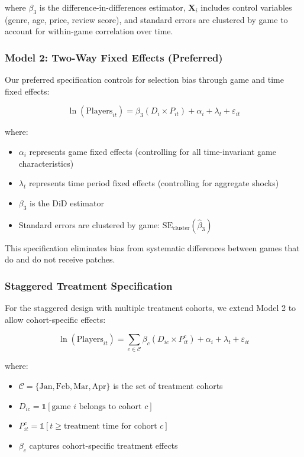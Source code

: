 \documentclass[12pt,a4paper]{article}
\begin{document}
where $\beta_3$ is the difference-in-differences estimator, $\mathbf{X}_i$ includes control variables (genre, age, price, review score), and standard errors are clustered by game to account for within-game correlation over time.

\subsubsection{Model 2: Two-Way Fixed Effects (Preferred)}

Our preferred specification controls for selection bias through game and time fixed effects:

\begin{equation}
\ln(\text{Players}_{it}) = \beta_3 (D_i \times P_{it}) + \alpha_i + \lambda_t + \varepsilon_{it}
\label{eq:twfe}
\end{equation}

where:
\begin{itemize}
    \item $\alpha_i$ represents game fixed effects (controlling for all time-invariant game characteristics)
    \item $\lambda_t$ represents time period fixed effects (controlling for aggregate shocks)
    \item $\beta_3$ is the DiD estimator
    \item Standard errors are clustered by game: $\text{SE}_{\text{cluster}}(\hat{\beta}_3)$
\end{itemize}

This specification eliminates bias from systematic differences between games that do and do not receive patches.

\subsubsection{Staggered Treatment Specification}

For the staggered design with multiple treatment cohorts, we extend Model 2 to allow cohort-specific effects:

\begin{equation}
\ln(\text{Players}_{it}) = \sum_{c \in \mathcal{C}} \beta_c (D_{ic} \times P_{it}^c) + \alpha_i + \lambda_t + \varepsilon_{it}
\label{eq:staggered}
\end{equation}

where:
\begin{itemize}
    \item $\mathcal{C} = \{\text{Jan}, \text{Feb}, \text{Mar}, \text{Apr}\}$ is the set of treatment cohorts
    \item $D_{ic} = \mathbb{1}[\text{game } i \text{ belongs to cohort } c]$
    \item $P_{it}^c = \mathbb{1}[t \geq \text{treatment time for cohort } c]$
    \item $\beta_c$ captures cohort-specific treatment effects
\end{itemize}
\end{document}
